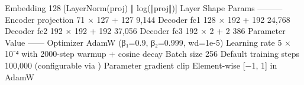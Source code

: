 {}\markdownRendererPipe{} Embedding \markdownRendererPipe{} 128 \markdownRendererPipe{} [LayerNorm(proj) ‖ log(‖proj‖)] \markdownRendererPipe{}\markdownRendererInterblockSeparator
{}
\markdownRendererSectionEnd \markdownRendererSectionBegin
{}\markdownRendererInterblockSeparator
{}\markdownRendererPipe{} Layer \markdownRendererPipe{} Shape \markdownRendererPipe{} Params \markdownRendererPipe{}\markdownRendererSoftLineBreak
{}\markdownRendererPipe{}---\markdownRendererPipe{}---\markdownRendererPipe{}---\markdownRendererPipe{}\markdownRendererSoftLineBreak
{}\markdownRendererPipe{} Encoder projection \markdownRendererPipe{} 71 × 127 + 127 \markdownRendererPipe{} 9,144 \markdownRendererPipe{}\markdownRendererSoftLineBreak
{}\markdownRendererPipe{} Decoder fc1 \markdownRendererPipe{} 128 × 192 + 192 \markdownRendererPipe{} 24,768 \markdownRendererPipe{}\markdownRendererSoftLineBreak
{}\markdownRendererPipe{} Decoder fc2 \markdownRendererPipe{} 192 × 192 + 192 \markdownRendererPipe{} 37,056 \markdownRendererPipe{}\markdownRendererSoftLineBreak
{}\markdownRendererPipe{} Decoder fc3 \markdownRendererPipe{} 192 × 2 + 2 \markdownRendererPipe{} 386 \markdownRendererPipe{}\markdownRendererSoftLineBreak
{}\markdownRendererPipe{}  \markdownRendererPipe{} \markdownRendererPipe{}  \markdownRendererPipe{}\markdownRendererInterblockSeparator
{}
\markdownRendererSectionEnd \markdownRendererSectionBegin
{}\markdownRendererInterblockSeparator
{}\markdownRendererPipe{} Parameter \markdownRendererPipe{} Value \markdownRendererPipe{}\markdownRendererSoftLineBreak
{}\markdownRendererPipe{}---\markdownRendererPipe{}---\markdownRendererPipe{}\markdownRendererSoftLineBreak
{}\markdownRendererPipe{} Optimizer \markdownRendererPipe{} AdamW (β₁=0.9, β₂=0.999, wd=1e-5) \markdownRendererPipe{}\markdownRendererSoftLineBreak
{}\markdownRendererPipe{} Learning rate \markdownRendererPipe{} 5 × 10⁻⁴ with 2000-step warmup + cosine decay \markdownRendererPipe{}\markdownRendererSoftLineBreak
{}\markdownRendererPipe{} Batch size \markdownRendererPipe{} 256 \markdownRendererPipe{}\markdownRendererSoftLineBreak
{}\markdownRendererPipe{} Default training steps \markdownRendererPipe{} 100,000 (configurable via ) \markdownRendererPipe{}\markdownRendererSoftLineBreak
{}\markdownRendererPipe{} Parameter gradient clip \markdownRendererPipe{} Element-wise [−1, 1] in AdamW \markdownRendererPipe{}\markdownRendererSoftLineBreak
